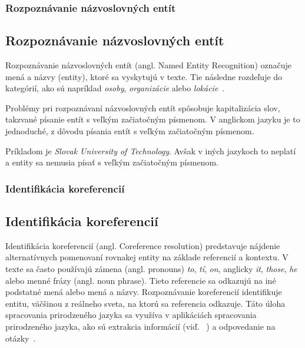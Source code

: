%
%
{
	\subsubsection{Rozpoznávanie názvoslovných entít}
}
{
	\subsection{Rozpoznávanie názvoslovných entít}
}
\label{subsubsec:ner}
Rozpoznávanie názvoslovných entít (angl. Named Entity Recognition) označuje mená a názvy (entity), ktoré sa vyskytujú v texte. Tie následne rozdeľuje do kategórií, ako sú napríklad \textit{osoby}, \textit{organizácie} alebo \textit{lokácie}~\cite{collobert2011}.

Problémy pri rozpoznávaní názvoslovných entít spôsobuje kapitalizácia slov, takzvané písanie entít s veľkým začiatočným písmenom. V anglickom jazyku je to jednoduché, z dôvodu písania entít s veľkým začiatočným písmenom.

Príkladom je \textit{Slovak University of Technology}. Avšak v iných jazykoch to neplatí a entity sa nemusia písať s veľkým začiatočným písmenom.

%
%
{
	\subsubsection{Identifikácia koreferencií}
}
{
	\subsection{Identifikácia koreferencií}
}
\label{subsubsec:corefparsing}
Identifikácia koreferencií (angl. Coreference resolution) predstavuje nájdenie alternatívnych pomenovaní rovnakej entity na základe referencií a kontextu. V texte sa často používajú zámena (angl. pronouns) \textit{to}, \textit{tí}, \textit{on}, anglicky \textit{it}, \textit{those}, \textit{he} alebo menné frázy (angl. noun phrase). Tieto referencie sa odkazujú na iné podstatné mená alebo mená a názvy. Rozpoznávanie koreferencií identifikuje entitu, väčšinou z reálneho sveta, na ktorú sa referencia odkazuje. Táto úloha spracovania prirodzeného jazyka sa využíva v aplikáciách spracovania prirodzeného jazyka, ako sú extrakcia informácií (viď. ~) a odpovedanie na otázky~\cite{Bryl}.

